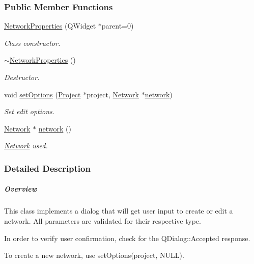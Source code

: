 \subsubsection*{Public Member Functions}
\begin{DoxyCompactItemize}
\item 
\hyperlink{group___window_ga3d9dac6454f6e722360d9d77af85e4ce}{Network\+Properties} (Q\+Widget $\ast$parent=0)
\begin{DoxyCompactList}\small\item\em Class constructor. \end{DoxyCompactList}\item 
\hyperlink{group___window_ga097b617788eebe80236c0041f8293422}{$\sim$\+Network\+Properties} ()
\begin{DoxyCompactList}\small\item\em Destructor. \end{DoxyCompactList}\item 
void \hyperlink{group___window_ga9dd17216f65e1c35012699e13547d984}{set\+Options} (\hyperlink{class_project}{Project} $\ast$project, \hyperlink{class_network}{Network} $\ast$\hyperlink{group___window_gac166b4624361fe4f3003bbe5553ad18b}{network})
\begin{DoxyCompactList}\small\item\em Set edit options. \end{DoxyCompactList}\item 
\hyperlink{class_network}{Network} $\ast$ \hyperlink{group___window_gac166b4624361fe4f3003bbe5553ad18b}{network} ()
\begin{DoxyCompactList}\small\item\em \hyperlink{class_network}{Network} used. \end{DoxyCompactList}\end{DoxyCompactItemize}


\subsubsection{Detailed Description}
\subparagraph*{Overview}

This class implements a dialog that will get user input to create or edit a network. All parameters are validated for their respective type.

In order to verify user confirmation, check for the Q\+Dialog\+::\+Accepted response.

To create a new network, use set\+Options(project, N\+U\+L\+L).

